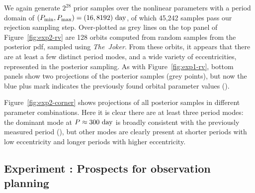 \documentclass[manuscript, letterpaper]{aastex6}
\newcommand{\project}[1]{\textsl{#1}}
\newcommand{\acronym}[1]{{\small{#1}}}
\newcommand{\apogee}{\project{\acronym{APOGEE}}}
\newcommand{\samplername}{\project{The~Joker}}
\newcommand{\figname}{Figure}
\newcounter{expcounter}
\begin{document}
We again generate $2^{28}$ prior samples over the nonlinear parameters with a
period domain of $(P_{\rm min}, P_{\rm max}) = (16, 8192)~{\rm day}$, of which
45,242 samples pass our rejection sampling step.
Over-plotted as grey lines on the top panel of \figname~\ref{fig:exp2-rv} are
128 orbits computed from random samples from the posterior pdf, sampled using
\samplername.
From these orbits, it appears that there are at least a few distinct period
modes, and a wide variety of eccentricities, represented in the posterior
sampling.
As with \figname~\ref{fig:exp1-rv}, bottom panels show two projections of the
posterior samples (grey points), but now the blue plus mark indicates the
previously found orbital parameter values (\citealt{Troup:2016}).

\figname~\ref{fig:exp2-corner} shows projections of all posterior samples in
different parameter combinations.
Here it is clear there are at least three period modes: the dominant mode at $P
\approx 300~{\rm day}$ is broadly consistent with the previously measured period
(\citealt{Troup:2016}), but other modes are clearly present at shorter periods
with low eccentricity and longer periods with higher eccentricity.



\subsection{Experiment : Prospects for observation planning}
\end{document}
